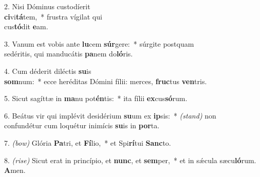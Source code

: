 2. Nisi Dóminus custodíerit\\ \textbf{ci}vi\textbf{tá}tem,~* frustra vígilat qui\\ cus\textbf{tó}dit \textbf{e}am.

3. Vanum est vobis ante \textbf{lu}cem \textbf{súr}gere:~* súrgite postquam\\ sedéritis, qui manducátis \textbf{pa}nem do\textbf{ló}ris.

4. Cum déderit diléctis \textbf{su}is\\ \textbf{som}num:~* ecce heréditas Dómini fílii: merces, \textbf{fruc}tus \textbf{ven}tris.

5. Sicut sagíttæ in \textbf{ma}nu pot\textbf{én}tis:~* ita fílii \textbf{ex}cus\textbf{só}rum.

6. Beátus vir qui implévit desidérium \textbf{su}um ex \textbf{ip}sis:~* {\color{red}\textit{(stand)}} non\\ confundétur cum loquétur inimícis \textbf{su}is in \textbf{por}ta.

7. {\color{red}\textit{(bow)}} Glória \textbf{Pa}tri, et \textbf{Fí}lio,~* et Spi\textbf{rí}tui \textbf{Sanc}to.

8. {\color{red}\textit{(rise)}} Sicut erat in princípio, et \textbf{nunc}, et \textbf{sem}per,~* et in s\'{\ae}cula sæcu\textbf{ló}rum. \textbf{A}men.